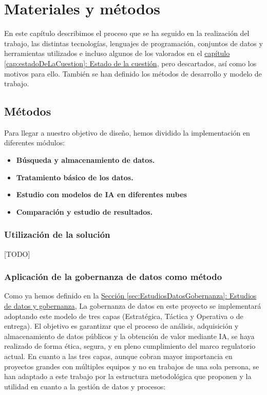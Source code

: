 \chapter{Materiales y métodos}
\label{cap:Materiales y metodos}



En este capítulo describimos el proceso que se ha seguido en la realización del trabajo, las distintas tecnologías, lenguajes de programación, conjuntos de datos y herramientas utilizados e incluso algunos de los valorados en el \hyperref[cap:estadoDeLaCuestion]{capítulo \ref*{cap:estadoDeLaCuestion}: Estado de la cuestión}, pero descartados, así como los motivos para ello. También se han definido los métodos de desarrollo y modelo de trabajo. \\


\section{Métodos}

Para llegar a nuestro objetivo de diseño, hemos dividido la implementación en diferentes módulos:

\begin{itemize}
	\item \textbf{ Búsqueda y almacenamiento de datos.}
	\item \textbf{ Tratamiento básico de los datos.}
	\item \textbf{ Estudio con modelos de IA en diferentes nubes}
	\item \textbf{ Comparación y estudio de resultados.}
\end{itemize}

\subsection{Utilización de la solución}

[TODO]

\subsection{Aplicación de la gobernanza de datos como método}  \label{sec:Metodos_Gobernanza}

Como ya hemos definido en la \hyperref[sec:EstudiosDatosGobernanza]{Sección \ref*{sec:EstudiosDatosGobernanza}: Estudios de datos y gobernanza}, La gobernanza de datos en este proyecto se implementará adoptando este modelo de tres capas (Estratégica, Táctica y Operativa o de entrega). El objetivo es garantizar que el proceso de análisis, adquisición y almacenamiento de datos públicos y la obtención de valor mediante IA, se haya realizado de forma ética, segura, y en pleno cumplimiento del marco regulatorio actual. En cuanto a las tres capas, aunque cobran mayor importancia en proyectos grandes con múltiples equipos y no en trabajos de una sola persona, se han adaptado a este trabajo por la estructura metodológica que proponen y la utilidad en cuanto a la gestión de datos y procesos:

